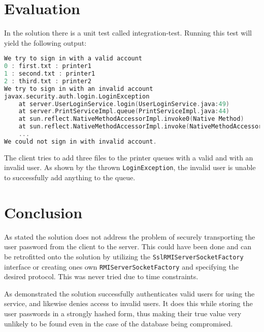 \documentclass[12pt]{article}
\begin{document}
\newpage

\section{Evaluation}
\label{sec:Evaluation}

In the solution there is a unit test called integration-test. Running this test will yield the following output:

\begin{lstlisting}[language=C]
We try to sign in with a valid account
0 : first.txt : printer1
1 : second.txt : printer1
2 : third.txt : printer2
We try to sign in with an invalid account
javax.security.auth.login.LoginException
	at server.UserLoginService.login(UserLoginService.java:49)
	at server.PrintServiceImpl.queue(PrintServiceImpl.java:44)
	at sun.reflect.NativeMethodAccessorImpl.invoke0(Native Method)
	at sun.reflect.NativeMethodAccessorImpl.invoke(NativeMethodAccessorImpl.java:62)
    ...
We could not sign in with invalid account.
\end{lstlisting}

The client tries to add three files to the printer queues with a valid and with an invalid user. As shown by the thrown \texttt{LoginException}, the invalid user is unable to successfully add anything to the queue.

\section{Conclusion}
\label{sec:Conclusion}

As stated the solution does not address the problem of securely transporting the user password from the client to the server. This could have been done and can be retrofitted onto the solution by utilizing the \texttt{SslRMIServerSocketFactory} interface or creating ones own \texttt{RMIServerSocketFactory} and specifying the desired protocol. This was never tried due to time constraints.

As demonstrated the solution successfully authenticates valid users for using the service, and likewise denies access to invalid users. It does this while storing the user passwords in a strongly hashed form, thus making their true value very unlikely to be found even in the case of the database being compromised.




%
\end{document}
